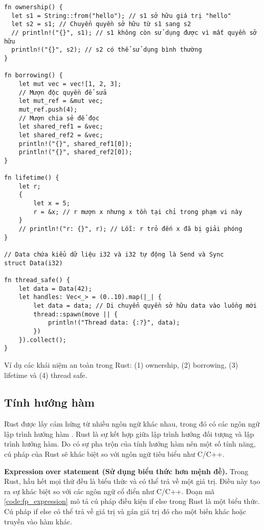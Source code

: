 \begin{listing}[H]
\begin{verbatim}
fn ownership() {
  let s1 = String::from("hello"); // s1 sở hữu giá trị "hello"
  let s2 = s1; // Chuyển quyền sở hữu từ s1 sang s2
  // println!("{}", s1); // s1 không còn sử dụng được vì mất quyền sở hữu
  println!("{}", s2); // s2 có thể sử dụng bình thường
}

fn borrowing() {
    let mut vec = vec![1, 2, 3];
    // Mượn độc quyền để sửa
    let mut_ref = &mut vec;
    mut_ref.push(4);
    // Mượn chia sẻ để đọc
    let shared_ref1 = &vec;
    let shared_ref2 = &vec;
    println!("{}", shared_ref1[0]);
    println!("{}", shared_ref2[0]);
}

fn lifetime() {
    let r;
    {
        let x = 5;
        r = &x; // r mượn x nhưng x tồn tại chỉ trong phạm vi này
    }
    // println!("r: {}", r); // Lỗi: r trỏ đến x đã bị giải phóng
}

// Data chứa kiểu dữ liệu i32 và i32 tự động là Send và Sync
struct Data(i32)

fn thread_safe() {
    let data = Data(42);
    let handles: Vec<_> = (0..10).map(|_| {
        let data = data; // Di chuyển quyền sở hữu data vào luồng mới
        thread::spawn(move || {
            println!("Thread data: {:?}", data);
        })
    }).collect();
}
\end{verbatim}
\caption{Ví dụ các khái niệm an toàn trong Rust: (1) ownership, (2) borrowing, (3) lifetime và (4) thread safe.}
\label{code:c2_safe_rust}
\end{listing}

\subsection{Tính hướng hàm}

Rust được lấy cảm hứng từ nhiều ngôn ngữ khác nhau, trong đó có các ngôn ngữ lập trình hướng hàm \cite{hughes1989functional}.
Rust là sự kết hợp giữa lập trình hướng đối tượng và lập trình hướng hàm.
Do có sự pha trộn của tính hướng hàm nên một số tính năng, cú pháp của Rust sẽ khác biệt so với ngôn ngữ tiêu biểu như C/C++.

\textbf{Expression over statement (Sử dụng biểu thức hơn mệnh đề).}
Trong Rust, hầu hết mọi thứ đều là biểu thức và có thể trả về một giá trị.
Điều này tạo ra sự khác biệt so với các ngôn ngữ cổ điển như C/C++.
Đoạn mã \ref{code:fp_expression} mô tả cú pháp điều kiện if else trong Rust là một biểu thức.
Cú pháp if else có thể trả về giá trị và gán giá trị đó cho một biến khác hoặc truyền vào hàm khác.

